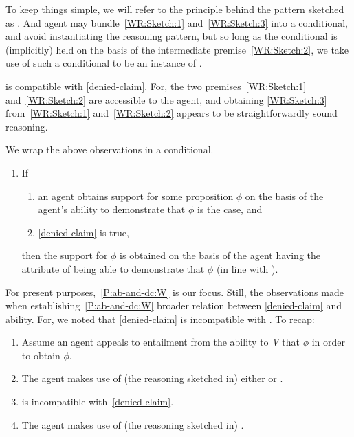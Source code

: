\documentclass[10pt]{article}
\begin{document}
\begin{note}[Attribute]
  To keep things simple, we will refer to the principle behind the pattern sketched as \AR{}.
  And agent may bundle~\ref{WR:Sketch:1} and~\ref{WR:Sketch:3} into a conditional, and avoid instantiating the reasoning pattern, but so long as the conditional is (implicitly) held on the basis of the intermediate premise~\ref{WR:Sketch:2}, we take use of such a conditional to be an instance of \AR{}.

  \AR{} is compatible with \ref{denied-claim}.
  For, the two premises~\ref{WR:Sketch:1} and~\ref{WR:Sketch:2} are accessible to the agent, and obtaining \ref{WR:Sketch:3} from~\ref{WR:Sketch:1} and~\ref{WR:Sketch:2} appears to be straightforwardly sound reasoning.
\end{note}

\begin{note}
  We wrap the above observations in a conditional.
  \begin{enumerate}[label=(C\arabic*), ref=(C\arabic*)]
  \item\label{P:ab-and-dc:W} If
    \begin{enumerate}[label=(C1\alph*), ref=(C1\alph*)]
    \item an agent obtains support for some proposition \(\phi\) on the basis of the agent's ability to demonstrate that \(\phi\) is the case, and
    \item \ref{denied-claim} is true,
    \end{enumerate}
    then the support for \(\phi\) is obtained on the basis of the agent having the attribute of being able to demonstrate that \(\phi\) (in line with \AR{}).
  \end{enumerate}
\end{note}

\begin{note}
  For present purposes,~\ref{P:ab-and-dc:W} is our focus.
  Still, the observations made when establishing~\ref{P:ab-and-dc:W} broader relation between \ref{denied-claim} and ability.
  For, we noted that \ref{denied-claim} is incompatible with \WR{}.
  To recap:
  \begin{enumerate}[label=(B\arabic*), ref=(B\arabic*)]
  \item Assume an agent appeals to entailment from the ability to \emph{V} that \(\phi\) in order to obtain \(\phi\).
  \item The agent makes use of (the reasoning sketched in) either \AR{} or \WR{}.
  \item \WR{} is incompatible with~\ref{denied-claim}.
  \item The agent makes use of (the reasoning sketched in) \AR{}.
  \end{enumerate}
\end{note}
\end{document}
